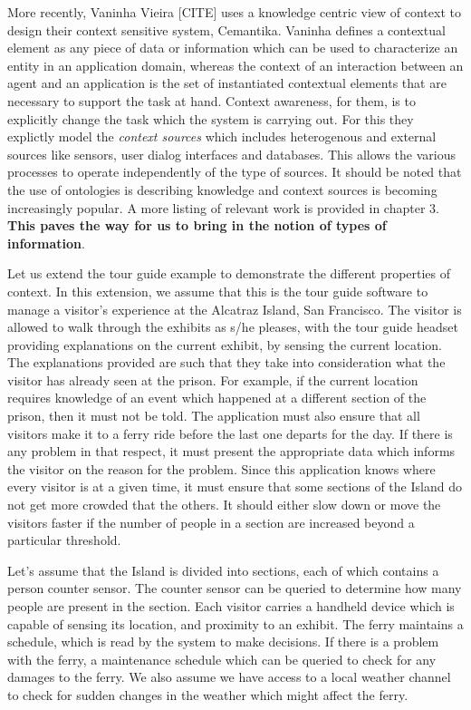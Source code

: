 More recently, Vaninha Vieira [CITE] uses a knowledge centric view of context to design their context sensitive system, Cemantika. Vaninha defines a contextual element as any piece of data or information which can be used to characterize an entity in an application domain, whereas the context of an interaction between an agent and an application is the set of instantiated contextual elements that are necessary to support the task at hand. Context awareness, for them, is to explicitly change the task which the system is carrying out. For this they explictly model the \textit{context sources} which includes heterogenous and  external sources like sensors, user dialog interfaces and databases. This allows the various processes to operate independently of the type of sources. It should be noted that the use of ontologies is describing knowledge and context sources is becoming increasingly popular. A more listing of relevant work is provided in chapter 3. \textbf{This paves the way for us to bring in the notion of types of information}.

Let us extend the tour guide example to demonstrate the different properties of context. In this extension, we assume that this is the tour guide software to manage a visitor's experience at the Alcatraz Island, San Francisco. The visitor is allowed to walk through the exhibits as s/he pleases, with the tour guide headset providing explanations on the current exhibit, by sensing the current location. The explanations provided are such that they take into consideration what the visitor has already seen at the prison. For example, if the current location requires knowledge of an event which happened at a different section of the prison, then it must not be told. The application must also ensure that all visitors make it to a ferry ride before the last one departs for the day. If there is any problem in that respect, it must present the appropriate data which informs the visitor on the reason for the problem. Since this application knows where every visitor is at a given time, it must ensure that some sections of the Island do not get more crowded that the others. It should either slow down or move the visitors faster if the number of people in a section are increased beyond a particular threshold.

Let's assume that the Island is divided into sections, each of which contains a person counter sensor. The counter sensor can be queried to determine how many people are present in the section. Each visitor carries a handheld device which is capable of sensing its location, and proximity to an exhibit. The ferry maintains a schedule, which is read by the system to make decisions. If there is a problem with the ferry, a maintenance schedule which can be queried to check for any damages to the ferry. We also assume we have access to a local weather channel to check for sudden changes in the weather which might affect the ferry.

